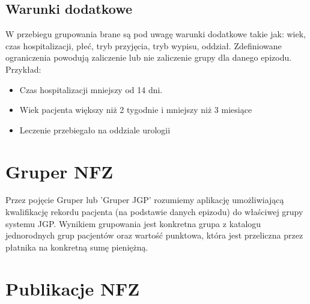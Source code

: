 
\subsection{Warunki dodatkowe}
\label{sec:warunkiDodatkowe}

W przebiegu grupowania brane są pod uwagę warunki dodatkowe takie jak: wiek, czas hospitalizacji, płeć, tryb przyjęcia, tryb wypisu, oddział. Zdefiniowane ograniczenia powodują zaliczenie lub nie zaliczenie grupy dla danego epizodu.
Przykład:
\begin{itemize}
\item Czas hospitalizacji mniejszy od 14 dni.
\item Wiek pacjenta większy niż 2 tygodnie i mniejszy niż 3 miesiące
\item Leczenie przebiegało na oddziale urologii
\end{itemize}


\section{Gruper NFZ}
\label{sec:gruperNFZ}

Przez pojęcie Gruper lub 'Gruper JGP' rozumiemy aplikację umożliwiającą kwalifikację rekordu pacjenta (na podstawie danych epizodu) do właściwej grupy systemu JGP. Wynikiem grupowania jest konkretna grupa z katalogu jednorodnych grup pacjentów oraz wartość punktowa, która jest przeliczna przez płatnika na konkretną sumę pieniężną.


\section{Publikacje NFZ}
\label{sec:publikacjeNFZ}

